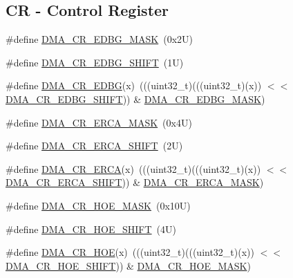 \subsection*{CR -\/ Control Register}
\begin{DoxyCompactItemize}
\item 
\#define \mbox{\hyperlink{group___d_m_a___register___masks_gaa2605f7da2bd6fae13e3e38830bafb1d}{D\+M\+A\+\_\+\+C\+R\+\_\+\+E\+D\+B\+G\+\_\+\+M\+A\+SK}}~(0x2\+U)
\item 
\#define \mbox{\hyperlink{group___d_m_a___register___masks_ga8a25fbfa3435be2df140701c300f6cc5}{D\+M\+A\+\_\+\+C\+R\+\_\+\+E\+D\+B\+G\+\_\+\+S\+H\+I\+FT}}~(1\+U)
\item 
\#define \mbox{\hyperlink{group___d_m_a___register___masks_gaffa31ab52dd718d4a766970cdd5d29b7}{D\+M\+A\+\_\+\+C\+R\+\_\+\+E\+D\+BG}}(x)~(((uint32\+\_\+t)(((uint32\+\_\+t)(x)) $<$$<$ \mbox{\hyperlink{group___d_m_a___register___masks_ga8a25fbfa3435be2df140701c300f6cc5}{D\+M\+A\+\_\+\+C\+R\+\_\+\+E\+D\+B\+G\+\_\+\+S\+H\+I\+FT}})) \& \mbox{\hyperlink{group___d_m_a___register___masks_gaa2605f7da2bd6fae13e3e38830bafb1d}{D\+M\+A\+\_\+\+C\+R\+\_\+\+E\+D\+B\+G\+\_\+\+M\+A\+SK}})
\item 
\#define \mbox{\hyperlink{group___d_m_a___register___masks_ga52ad0bfd27aa8dbb1e157eb2c8099c53}{D\+M\+A\+\_\+\+C\+R\+\_\+\+E\+R\+C\+A\+\_\+\+M\+A\+SK}}~(0x4\+U)
\item 
\#define \mbox{\hyperlink{group___d_m_a___register___masks_gab3e613091d693c1c110bfbb902d58392}{D\+M\+A\+\_\+\+C\+R\+\_\+\+E\+R\+C\+A\+\_\+\+S\+H\+I\+FT}}~(2\+U)
\item 
\#define \mbox{\hyperlink{group___d_m_a___register___masks_ga483a234dc3d8a4464870d008358d6db2}{D\+M\+A\+\_\+\+C\+R\+\_\+\+E\+R\+CA}}(x)~(((uint32\+\_\+t)(((uint32\+\_\+t)(x)) $<$$<$ \mbox{\hyperlink{group___d_m_a___register___masks_gab3e613091d693c1c110bfbb902d58392}{D\+M\+A\+\_\+\+C\+R\+\_\+\+E\+R\+C\+A\+\_\+\+S\+H\+I\+FT}})) \& \mbox{\hyperlink{group___d_m_a___register___masks_ga52ad0bfd27aa8dbb1e157eb2c8099c53}{D\+M\+A\+\_\+\+C\+R\+\_\+\+E\+R\+C\+A\+\_\+\+M\+A\+SK}})
\item 
\#define \mbox{\hyperlink{group___d_m_a___register___masks_ga6324cec54d0032bcc142e28f4e1b5978}{D\+M\+A\+\_\+\+C\+R\+\_\+\+H\+O\+E\+\_\+\+M\+A\+SK}}~(0x10\+U)
\item 
\#define \mbox{\hyperlink{group___d_m_a___register___masks_gaddcd684abfce8db15928255dc243dbcb}{D\+M\+A\+\_\+\+C\+R\+\_\+\+H\+O\+E\+\_\+\+S\+H\+I\+FT}}~(4\+U)
\item 
\#define \mbox{\hyperlink{group___d_m_a___register___masks_gada3b862eedf2924cbfce0cefa3dcb1ad}{D\+M\+A\+\_\+\+C\+R\+\_\+\+H\+OE}}(x)~(((uint32\+\_\+t)(((uint32\+\_\+t)(x)) $<$$<$ \mbox{\hyperlink{group___d_m_a___register___masks_gaddcd684abfce8db15928255dc243dbcb}{D\+M\+A\+\_\+\+C\+R\+\_\+\+H\+O\+E\+\_\+\+S\+H\+I\+FT}})) \& \mbox{\hyperlink{group___d_m_a___register___masks_ga6324cec54d0032bcc142e28f4e1b5978}{D\+M\+A\+\_\+\+C\+R\+\_\+\+H\+O\+E\+\_\+\+M\+A\+SK}})
$$
\end{DoxyCompactItemize}
